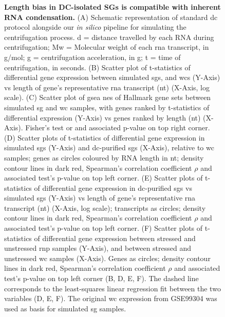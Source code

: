 \clearpage


\begin{figure}[t]
	\captionsetup{labelformat=adja-page}
	\ContinuedFloat
	\caption[]{\textbf{Length bias in DC-isolated SGs is compatible with inherent RNA condensation.} (A) Schematic representation of standard \gls{dc} protocol alongside our \textit{in silico} pipeline for simulating the centrifugation process. d = distance travelled by each RNA during centrifugation; Mw = Molecular weight of each \gls{rna} transcript, in g/mol; g = centrifugation acceleration, in g; t = time of centrifugation, in seconds.  (B) Scatter plot of t-statistics of differential gene expression between simulated \glspl{sg}, and \glspl{wc} (Y-Axis) \gls{vs} length of gene's representative \gls{rna} transcript (\gls{nt}) (X-Axis, log scale). (C) Scatter plot of \gls{gsea} \gls{nes} of Hallmark gene sets between simulated \gls{sg} and \gls{wc} samples, with genes ranked by t-statistics of differential expression (Y-Axis) \gls{vs} genes ranked by length (\gls{nt}) (X-Axis). Fisher’s test \gls{or} and associated p-value on top right corner. (D) Scatter plots of t-statistics of differential gene expression in simulated \glspl{sg} (Y-Axis) and \gls{dc}-purified \glspl{sg} (X-Axis), relative to \gls{wc} samples; genes as circles coloured by RNA length in \gls{nt}; density contour lines in dark red, Spearman's correlation coefficient $\rho$ and associated test's p-value on top left corner. (E) Scatter plots of t-statistics of differential gene expression in \gls{dc}-purified \glspl{sg} \gls{vs} simulated \glspl{sg} (Y-Axis) \gls{vs} length of gene's representative \gls{rna} transcript (\gls{nt}) (X-Axis, log scale); transcripts as circles; density contour lines in dark red, Spearman’s correlation coefficient $\rho$ and associated test’s p-value on top left corner. (F) Scatter plots of t-statistics of differential gene expression between stressed and unstressed \gls{rnp} samples (Y-Axis), and between stressed and unstressed \gls{wc} samples (X-Axis). Genes as circles; density contour lines in dark red, Spearman's correlation coefficient $\rho$ and associated test's p-value on top left corner (B, D, E, F). The dashed line corresponds to the least-squares linear regression fit between the two variables (D, E, F). The original \gls{wc} expression from GSE99304\cite{khong_stress_2017} was used as basis for simulated \gls{sg} samples.}
\end{figure}
\noindent
